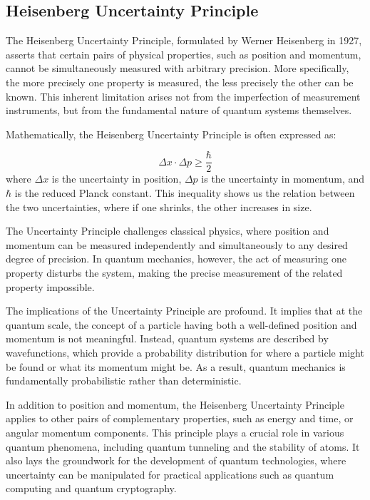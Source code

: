 \documentclass{report}
\begin{document}
\subsection{Heisenberg Uncertainty Principle}

The Heisenberg Uncertainty Principle, formulated by Werner Heisenberg in 1927, asserts that certain pairs of physical properties, such as position and momentum, cannot be simultaneously measured with arbitrary precision. More specifically, the more precisely one property is measured, the less precisely the other can be known. This inherent limitation arises not from the imperfection of measurement instruments, but from the fundamental nature of quantum systems themselves.

Mathematically, the Heisenberg Uncertainty Principle is often expressed as:

\begin{equation}
    \Delta x \cdot \Delta p \geq \frac{\hbar}{2}
    \label{eq:heisenberg_uncertainty}
\end{equation}
where \(\Delta x\) is the uncertainty in position, \(\Delta p\) is the uncertainty in momentum, and \(\hbar\) is the reduced Planck constant. This inequality shows us the relation between the two uncertainties, where if one shrinks, the other increases in size.

The Uncertainty Principle challenges classical physics, where position and momentum can be measured independently and simultaneously to any desired degree of precision. In quantum mechanics, however, the act of measuring one property disturbs the system, making the precise measurement of the related property impossible. 

The implications of the Uncertainty Principle are profound. It implies that at the quantum scale, the concept of a particle having both a well-defined position and momentum is not meaningful. Instead, quantum systems are described by wavefunctions, which provide a probability distribution for where a particle might be found or what its momentum might be. As a result, quantum mechanics is fundamentally probabilistic rather than deterministic.

In addition to position and momentum, the Heisenberg Uncertainty Principle applies to other pairs of complementary properties, such as energy and time, or angular momentum components. This principle plays a crucial role in various quantum phenomena, including quantum tunneling and the stability of atoms. It also lays the groundwork for the development of quantum technologies, where uncertainty can be manipulated for practical applications such as quantum computing and quantum cryptography.
\end{document}
